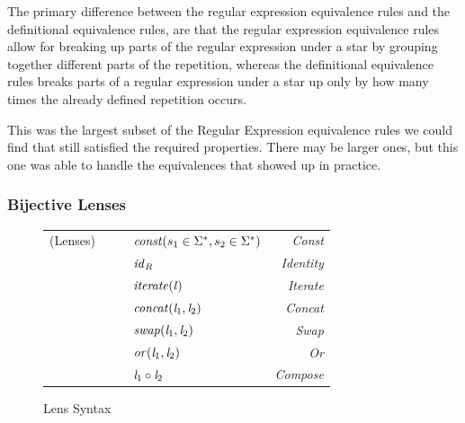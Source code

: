 \documentclass[numbers]{sigplanconf}
\begin{document}
The primary difference between the regular expression equivalence rules and the
definitional equivalence rules, are that the regular expression equivalence
rules allow for breaking up parts of the regular expression under a star by
grouping together different parts of the repetition, whereas the definitional
equivalence rules breaks parts of a regular expression under a star up only by
how many times the already defined repetition occurs.

This was the largest subset of the Regular Expression equivalence rules we could
find that still satisfied the required properties.  There may be larger ones,
but this one was able to handle the equivalences that showed up in practice.

\subsubsection{Bijective Lenses}

\begin{figure}
  \centering
  \begin{tabular}{l@{\ }l@{\ }c@{\ }l@{\ }>{\itshape\/}r}
    (Lenses)& \Lens{} & \GEq{} & $\mathit{const}(s_1 \in {\ensuremath{\Sigma}}^*,s_2 \in {\ensuremath{\Sigma}}^*)$ & Const \\
            & & & \GBar{} $\mathit{id}_{\mathit{R}}$ & Identity\\
            & & & \GBar{} $\mathit{iterate(\mathit{l})}$ & Iterate \\
            & & & \GBar{} $\mathit{concat}(\mathit{l}_1,\mathit{l}_2)$ & Concat \\
            & & & \GBar{} $\mathit{swap}(\mathit{l}_1,\mathit{l}_2)$ & Swap\\
            & & & \GBar{} $\mathit{or}(\mathit{l}_1,\mathit{l}_2)$ & Or\\
            & & & \GBar{} $\mathit{l}_1 \circ \mathit{l}_2$ & Compose\\
  \end{tabular}
  \caption{Lens Syntax}
  \label{fig:lens-syntax}
\end{figure}
\end{document}
